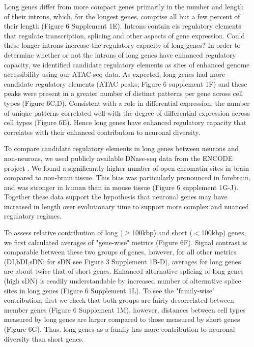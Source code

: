 Long genes differ from more compact genes primarily in the number and length of their introns, which, for the longest genes, comprise all but a few percent of their length (Figure 6 Supplement 1E). Introns contain cis regulatory elements that regulate transcription, splicing and other aspects of gene expression\citep{Rebollo_2012,Friedli_2015}. Could these longer introns increase the regulatory capacity of long genes? In order to determine whether or not the introns of long genes have enhanced regulatory capacity, we identified candidate regulatory elements as sites of enhanced genome accessibility using our ATAC-seq data. As expected, long genes had more candidate regulatory elements (ATAC peaks; Figure 6 supplement 1F) and these peaks were present in a greater number of distinct patterns per gene across cell types (Figure 6C,D). Consistent with a role in differential expression, the number of unique patterns correlated well with the degree of differential expression across cell types (Figure 6E). Hence long genes have enhanced regulatory capacity that correlates with their enhanced contribution to neuronal diversity.

To compare candidate regulatory elements in long genes between neurons and non-neurons, we used publicly available DNase-seq data from the ENCODE project \citep{Dunham_2012}. We found a significantly higher number of open chromatin sites in brain compared to non-brain tissue. This bias was particularly pronounced in forebrain, and was stronger in human than in mouse tissue (Figure 6 supplement 1G-J). Together these data support the hypothesis that neuronal genes may have increased in length over evolutionary time to support more complex and nuanced regulatory regimes. 

To assess relative contribution of long ($\geq$100kbp) and short ($<$100kbp) genes, we first calculated averages of "gene-wise" metrics (Figure 6F). Signal contrast is comparable between these two groups of genes, however, for all other metrics (DI,bDI,sDN; for sDN see Figure 3 Supplement 1B-D), averages for long genes are about twice that of short genes. Enhanced alternative splicing of long genes (high sDN) is readily understandable by increased number of alternative splice sites in long genes (Figure 6 Supplement 1L). To see the "family-wise" contribution, first we check that both groups are fairly decorrelated between member genes (Figure 6 Supplement 1M), however, distances between cell types measured by long genes are larger compared to those measured by short genes (Figure 6G). Thus, long genes as a family has more contribution to neuronal diversity than short genes. 








